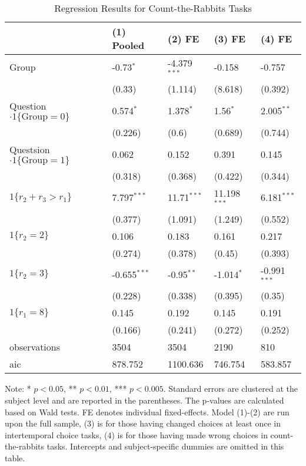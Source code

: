 \documentclass[12pt]{article}
\begin{document}
\begin{table}
    \caption{Regression Results for Count-the-Rabbits Tasks}
    \vspace*{12pt}
    \centering

      \begin{tabular}{lllll}
\hline
 & (1) Pooled & (2) FE & (3) FE & (4) FE \\
\hline
Group & -0.73$^{*}$ & -4.379$^{***}$ & -0.158 & -0.757 \\
 & (0.33) & (1.114) & (8.618) & (0.392) \\
Question$\cdot1\{\text{Group}=0\}$ & 0.574$^{*}$ & 1.378$^{*}$ & 1.56$^{*}$ & 2.005$^{**}$ \\
 & (0.226) & (0.6) & (0.689) & (0.744) \\
Questsion$\cdot1\{\text{Group}=1\}$ & 0.062 & 0.152 & 0.391 & 0.145 \\
 & (0.318) & (0.368) & (0.422) & (0.344) \\
$1\{r_2 + r_3 > r_1\}$ & 7.797$^{***}$ & 11.71$^{***}$ & 11.198$^{***}$ & 6.181$^{***}$ \\
 & (0.377) & (1.091) & (1.249) & (0.552) \\
$1\{r_2 =2\}$ & 0.106 & 0.183 & 0.161 & 0.217 \\
 & (0.274) & (0.378) & (0.45) & (0.393) \\
$1\{r_2=3\}$ & -0.655$^{***}$ & -0.95$^{**}$ & -1.014$^{*}$ & -0.991$^{***}$ \\
 & (0.228) & (0.338) & (0.395) & (0.35) \\
$1\{r_1=8\}$ & 0.145 & 0.192 & 0.145 & 0.191 \\
 & (0.166) & (0.241) & (0.272) & (0.252) \\\hline

observations & 3504 & 3504 & 2190 & 810 \\
aic & 878.752 & 1100.636 & 746.754 & 583.857 \\
\hline
\end{tabular}

    \vspace*{4pt}
    \centering
    \begin{minipage}{0.85\textwidth}
    {\par\footnotesize Note: * $p<0.05$, ** $p<0.01$, *** $p<0.005$. Standard errors are clustered at the subject level and are reported in the parentheses. The p-values are calculated based on Wald tests. FE denotes individual fixed-effects. Model (1)-(2) are run upon the full sample, (3) is for those having changed choices at least once in intertemporal choice tasks, (4) is for those having made wrong choices in count-the-rabbits tasks. Intercepts and subject-specific dummies are omitted in this table.}
    \end{minipage}
    \label{tab:exp3_reg_rabbit_choice}
\end{table}
\end{document}
